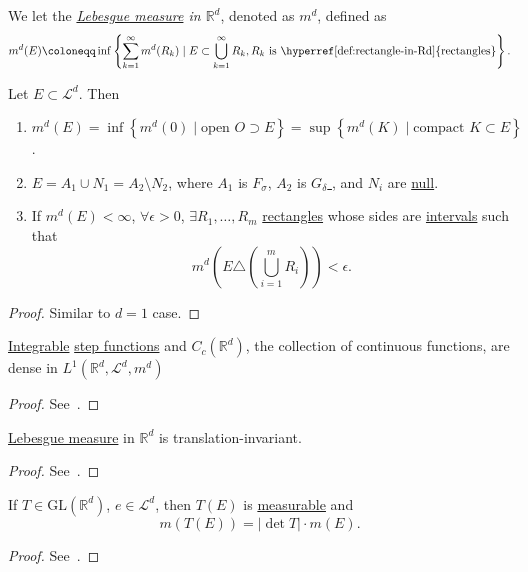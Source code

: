 \begin{definition}
	We let the \emph{\hyperref[def:Lebesgue-measure]{Lebesgue measure} in \(\mathbb{R} ^d\)}, denoted as \(m^d\), defined as
	\[
		m^d(E) \coloneqq \inf \left\{\sum\limits_{k=1}^{\infty} m^d(R_{k} )\mid E\subset \bigcup\limits_{k=1}^{\infty} R_{k} , R_{k} \text{ is \hyperref[def:rectangle-in-Rd]{rectangles}}\right\}.
	\]
\end{definition}
\begin{theorem}\label{thm:lec-20}
	Let \(E\subset \mathcal{L} ^d\). Then
	\begin{enumerate}[(1)]
		\item \(m^d(E) = \inf \left\{m^d (0) \mid \text{open } O\supset E \right\} = \sup \left\{m^d (K)\mid \text{compact }K\subset E \right\}\).
		\item \(E = A_1 \cup N_1 = A_2 \setminus N_2\), where \(A_1\) is \hyperref[def:F-sigma-set]{\(F_\sigma \)}, \(A_2\) is \hyperref[def:G-delta-set]{\(G_\delta \) }, and \(N_{i} \) are \hyperref[def:mu-null-set]{null}.
		\item If \(m^d(E)<\infty \), \(\forall \epsilon >0\), \(\exists R_1, \dots , R_m \) \hyperref[def:rectangle-in-Rd]{rectangles} whose sides are \underline{intervals} such that
		      \[
			      m^d \left(E\triangle \left(\bigcup\limits_{i=1}^{m} R_{i} \right)\right)< \epsilon .
		      \]
	\end{enumerate}
\end{theorem}
\begin{proof}
	Similar to \(d = 1\) case.
\end{proof}

\begin{theorem}
	\hyperref[def:integrable]{Integrable} \hyperref[def:step-function]{step functions} and \(C_c(\mathbb{R} ^d)\), the collection
	of continuous functions, are dense in \(L^1(\mathbb{R} ^d, \mathcal{L} ^d, m^d)\)
\end{theorem}
\begin{proof}
	See~\cite{folland1999real}.
\end{proof}

\begin{theorem}
	\hyperref[def:Lebesgue-measure]{Lebesgue measure} in \(\mathbb{R} ^d\) is translation-invariant.
\end{theorem}
\begin{proof}
	See~\cite{folland1999real}.
\end{proof}

\begin{theorem}\label{thm:effect-of-linear-transformation-on-Lebesgue-measure}
	If \(T\in \mathrm{GL} (\mathbb{R} ^d)\), \(e\in \mathcal{L} ^d\), then \(T(E)\) is \hyperref[def:measurable-function]{measurable} and
	\[
		m(T(E)) = \left\vert \det T \right\vert \cdot m(E).
	\]
\end{theorem}
\begin{proof}
	See~\cite{folland1999real}.
\end{proof}

